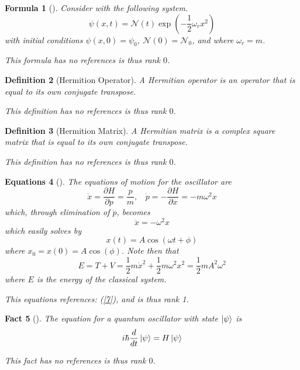 \documentclass{article}
\newtheorem{definition}{Definition}
\newtheorem{fact}[definition]{Fact}
\newtheorem{formula}[definition]{Formula}
\newtheorem{equations}[definition]{Equations}
\newtheorem{External Info}[definition]{External Info}
\begin{document}
\begin{tcolorbox}[title=Formula]\begin{formula}[]\label{10}Consider with the following system. 
 $$\psi(x,t)=\mathcal{N}(t)\exp\left(-\frac{1}{2}\omega_r x^2\right)$$
 with initial conditions $\psi(x,0)=\psi_0,~\mathcal{N}(0)=\mathcal{N}_0$, 
 and where $\omega_r=m$.
 
 This formula has no references is thus rank $0$.\end{formula}\end{tcolorbox}
\begin{tcolorbox}[title=Definition: Hermition Operator]\begin{definition}[Hermition Operator]\label{11}A Hermitian operator is an operator that is equal 
 to its own conjugate transpose.
 
 This definition has no references is thus rank $0$.\end{definition}\end{tcolorbox}
\begin{tcolorbox}[title=Definition: Hermition Matrix]\begin{definition}[Hermition Matrix]\label{12}A Hermitian matrix is a complex square 
 matrix that is equal to its own conjugate transpose.
 
 This definition has no references is thus rank $0$.\end{definition}\end{tcolorbox}
\begin{tcolorbox}[title=Equations]\begin{equations}[]\label{13}The equations of motion for the oscillator are $$\dot{x}=
 \frac{\partial H}{\partial p}=\frac{p}{m},~~~~\dot{p}=-\frac{\partial H}{\partial x}=
 -m\omega^2 x$$ which, through elimination of $\dot{p}$, becomes
 $$\ddot{x}=-\omega^2x$$ which easily solves by
 $$x(t)=A\cos(\omega t+\phi)$$ where $x_0=x(0)=A\cos(\phi)$. Note then that
 $$E=T+V=\frac{1}{2}m\dot{x}^2+\frac{1}{2}m\omega^2x^2=\frac{1}{2}mA^2\omega^2$$
 where $E$ is the energy of the classical system.
 
 This equations references: (\ref{7}), and is thus rank 1.\end{equations}\end{tcolorbox}
\begin{tcolorbox}[title=Fact]\begin{fact}[]\label{14}The equation for a quantum oscillator with state $\ket{\psi}$ is
 $$i\hbar\frac{d}{dt}\ket{\psi}=H\ket{\psi}$$
 
 This fact has no references is thus rank $0$.\end{fact}\end{tcolorbox}
\end{document}
